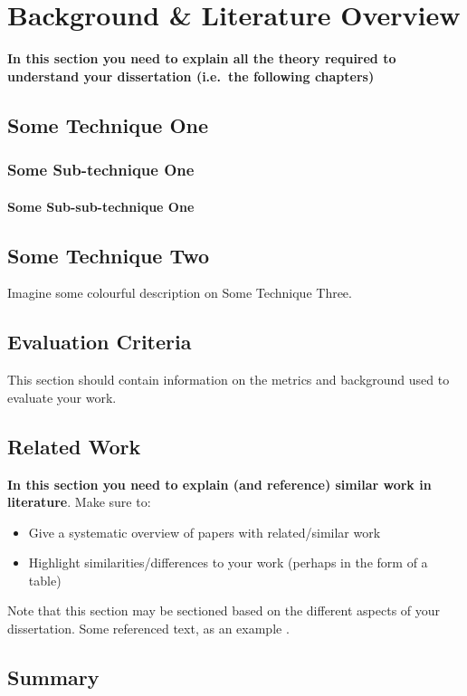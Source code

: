 \chapter{Background \& Literature Overview}
\textbf{In this section you need to explain all the theory required to understand your dissertation (i.e.\ the following chapters)}
\section{Some Technique One}
\blindtext
\subsection{Some Sub-technique One}
\blindtext
{}
\blindtext
\subsubsection{Some Sub-sub-technique One}
\blindtext
{}
\blindtext
{}

\section{Some Technique Two}
\blindtext[2]

Imagine some colourful description on Some Technique Three.

\blindtext[2]

\section{Evaluation Criteria}
This section should contain information on the metrics and background used to evaluate your work.
\section{Related Work}
\textbf{In this section you need to explain (and reference) similar work in literature}.  Make sure to:

\begin{itemize}
 \item Give a systematic overview of papers with related/similar work
 \item Highlight similarities/differences to your work (perhaps in the form of a table)
\end{itemize}

Note that this section may be sectioned based on the different aspects of your dissertation.  Some referenced text, as an example \citep{Arrighi2003, WithersMartinez2012, Ebejer2016}.

\section{Summary}
\blindtext